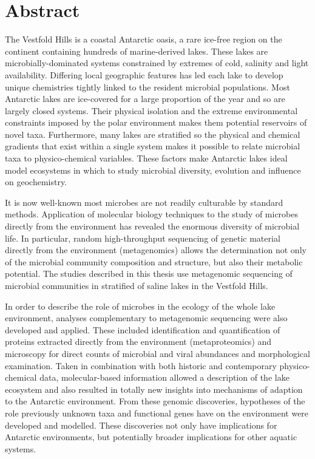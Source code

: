\chapter*{Abstract}

The Vestfold Hills is a coastal Antarctic oasis, a rare ice-free region on the continent containing hundreds of marine-derived lakes.
These lakes are microbially-dominated systems constrained by extremes of cold, salinity and light availability.
Differing local geographic features has led each lake to develop unique chemistries tightly linked to the resident microbial populations.
Most Antarctic lakes are ice-covered for a large proportion of the year and so are largely closed systems.
Their physical isolation and the extreme environmental constraints imposed by the polar environment makes them potential reservoirs of novel taxa.
Furthermore, many lakes are stratified so the physical and chemical gradients that exist within a single system makes it possible to relate microbial taxa to physico-chemical variables.
These factors make Antarctic lakes ideal model ecosystems in which to study microbial diversity, evolution and influence on geochemistry.

It is now well-known most microbes are not readily culturable by standard methods.
Application of molecular biology techniques to the study of microbes directly from the environment has revealed the enormous diversity of microbial life.
In particular, random high-throughput sequencing of genetic material directly from the environment (metagenomics) allows the determination not only of the microbial community composition and structure, but also their metabolic potential.
The studies described in this thesis use metagenomic sequencing of microbial communities in stratified of saline lakes in the Vestfold Hills.

In order to describe the role of microbes in the ecology of the whole lake environment, analyses complementary to metagenomic sequencing were also developed and applied.
These included identification and quantification of proteins extracted directly from the environment (metaproteomics) and microscopy for direct counts of microbial and viral abundances and morphological examination.
Taken in combination with both historic and contemporary physico-chemical data, molecular-based information allowed a description of the lake ecosystem and also resulted in totally new insights into mechanisms of adaption to the Antarctic environment.
From these genomic discoveries, hypotheses of the role previously unknown taxa and functional genes have on the environment were developed and modelled.
These discoveries not only have implications for Antarctic environments, but potentially broader implications for other aquatic systems.





